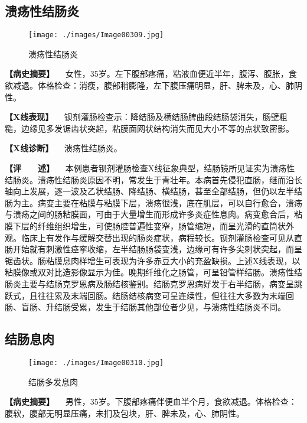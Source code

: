 \subsection{溃疡性结肠炎}

\begin{figure}[!htbp]
 \centering
 \texttt{[image: ./images/Image00309.jpg]}
 \captionsetup{justification=centering}
 \caption{溃疡性结肠炎}
 \label{fig5-6-3}
  \end{figure} 

\textbf{【病史摘要】}
　女性，35岁。左下腹部疼痛，粘液血便近半年，腹泻、腹胀，食欲减退。体格检查：消瘦，腹部稍膨隆，左下腹压痛明显，肝、脾未及，心、肺阴性。

\textbf{【X线表现】}
　钡剂灌肠检查示：降结肠及横结肠脾曲段结肠袋消失，肠壁粗糙，边缘见多发锯齿状突起，粘膜面网状结构消失而见大小不等的点状致密影。

\textbf{【X线诊断】} 　溃疡性结肠炎。

\textbf{【评　　述】}
　本例患者钡剂灌肠检查X线征象典型，结肠镜所见证实为溃疡性结肠炎。溃疡性结肠炎原因不明，常发生于青壮年。本病首先侵犯直肠，继而沿长轴向上发展，逐一波及乙状结肠、降结肠、横结肠，甚至全部结肠，但仍以左半结肠为主。病变主要在粘膜与粘膜下层，溃疡很浅，底在肌层，可以自行愈合，溃疡与溃疡之间的肠粘膜面，可由于大量增生而形成许多炎症性息肉。病变愈合后，粘膜下层的纤维组织增生，可使肠腔普遍性变窄，肠管缩短，而呈光滑的直筒状外观。临床上有发作与缓解交替出现的肠炎症状，病程较长。钡剂灌肠检查可见从直肠开始就有刺激性痉挛收缩，左半结肠肠袋变浅，边缘可有许多尖刺状突起，而呈锯齿状。肠粘膜息肉样增生可表现为许多赤豆大小的充盈缺损。上述X线表现，以粘膜像或双对比造影像显示为佳。晚期纤维化之肠管，可呈铅管样结肠。溃疡性结肠炎主要与结肠克罗恩病及肠结核鉴别。结肠克罗恩病好发于右半结肠，病变呈跳跃式，且往往累及末端回肠。结肠结核病变可呈连续性，但往往大多数为末端回肠、盲肠、升结肠受累，发生于结肠其他部位者少见，与溃疡性结肠炎不同。

\subsection{结肠息肉}

\begin{figure}[!htbp]
 \centering
 \texttt{[image: ./images/Image00310.jpg]}
 \captionsetup{justification=centering}
 \caption{结肠多发息肉}
 \label{fig5-6-4}
  \end{figure} 

\textbf{【病史摘要】}
　男性，35岁。下腹部疼痛伴便血半个月，食欲减退。体格检查：腹软，腹部无明显压痛，未扪及包块，肝、脾未及，心、肺阴性。

